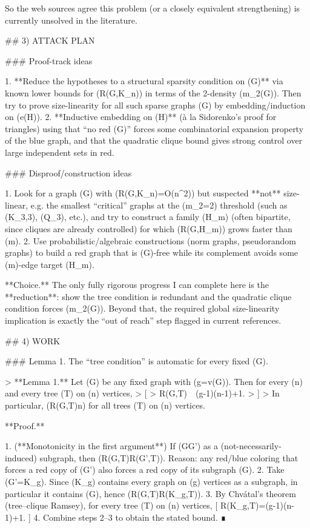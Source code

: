 So the web sources agree this problem (or a closely equivalent strengthening) is currently unsolved in the literature.

## 3) ATTACK PLAN

### Proof-track ideas

1. **Reduce the hypotheses to a structural sparsity condition on (G)** via known lower bounds for (R(G,K_n)) in terms of the 2-density (m_2(G)). Then try to prove size-linearity for all such sparse graphs (G) by embedding/induction on (e(H)).
2. **Inductive embedding on (H)** (à la Sidorenko’s proof for triangles) using that “no red (G)” forces some combinatorial expansion property of the blue graph, and that the quadratic clique bound gives strong control over large independent sets in red.

### Disproof/construction ideas

1. Look for a graph (G) with (R(G,K_n)=O(n^2)) but suspected **not** size-linear, e.g. the smallest “critical” graphs at the (m_2=2) threshold (such as (K_{3,3}), (Q_3), etc.), and try to construct a family (H_m) (often bipartite, since cliques are already controlled) for which (R(G,H_m)) grows faster than (m).
2. Use probabilistic/algebraic constructions (norm graphs, pseudorandom graphs) to build a red graph that is (G)-free while its complement avoids some (m)-edge target (H_m).

**Choice.** The only fully rigorous progress I can complete here is the **reduction**: show the tree condition is redundant and the quadratic clique condition forces (m_2(G)). Beyond that, the required global size-linearity implication is exactly the “out of reach” step flagged in current references.

## 4) WORK

### Lemma 1. The “tree condition” is automatic for every fixed (G).

> **Lemma 1.** Let (G) be any fixed graph with (g=v(G)). Then for every (n) and every tree (T) on (n) vertices,
> [
> R(G,T)\ \le\ (g-1)(n-1)+1.
> ]
> In particular, (R(G,T)\ll n) for all trees (T) on (n) vertices.

**Proof.**

1. (**Monotonicity in the first argument**) If (G\subseteq G') as a (not-necessarily-induced) subgraph, then (R(G,T)\le R(G',T)).
   Reason: any red/blue coloring that forces a red copy of (G') also forces a red copy of its subgraph (G).
2. Take (G'=K_g). Since (K_g) contains every graph on (g) vertices as a subgraph, in particular it contains (G), hence (R(G,T)\le R(K_g,T)).
3. By Chvátal’s theorem (tree–clique Ramsey), for every tree (T) on (n) vertices,
   [
   R(K_g,T)=(g-1)(n-1)+1.
   ]
4. Combine steps 2–3 to obtain the stated bound. ∎

